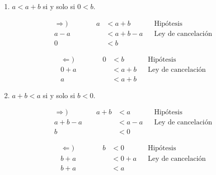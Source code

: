 \documentclass[11pt]{article}
\begin{document}
\begin{enumerate}[label=\alph*)]
\begin{enumerate}[label=\roman*)]
        \item $a<a+b$ si y solo si $0<b$.
        \begin{center}\vspace{-1em}
        \begin{minipage}[l]{.5\linewidth}
            \begin{align*}
                \Rightarrow) \qquad \qquad
                a &< a + b && \text{Hipótesis}\\
                a -a &< a + b - a && \text{Ley de cancelación}\\
                0 &< b%
            \end{align*}
        \end{minipage}%
        \begin{minipage}[r]{.5\linewidth}
            \begin{align*}
                \Leftarrow) \qquad \qquad
                0 &< b && \text{Hipótesis}\\
                0 + a &< a + b && \text{Ley de cancelación}\\
                a &< a + b%
            \end{align*}
        \end{minipage}
        \end{center}
        \item $a+b<a$ si y solo si $b<0$.
        \begin{center}\vspace{-1em}
        \begin{minipage}[l]{.5\linewidth}
            \begin{align*} \Rightarrow) \qquad \qquad
                a+b &< a && \text{Hipótesis}\\
                a+b-a &< a-a && \text{Ley de cancelación}\\
                b &< 0%
            \end{align*}
        \end{minipage}%
        \begin{minipage}[r]{.5\linewidth}
            \begin{align*} \Leftarrow) \qquad \qquad
                b &< 0 && \text{Hipótesis}\\
                b + a &< 0 + a && \text{Ley de cancelación}\\
                b+ a &< a%
            \end{align*}

\end{minipage}
\end{center}
\end{enumerate}
\end{enumerate}
\end{document}
